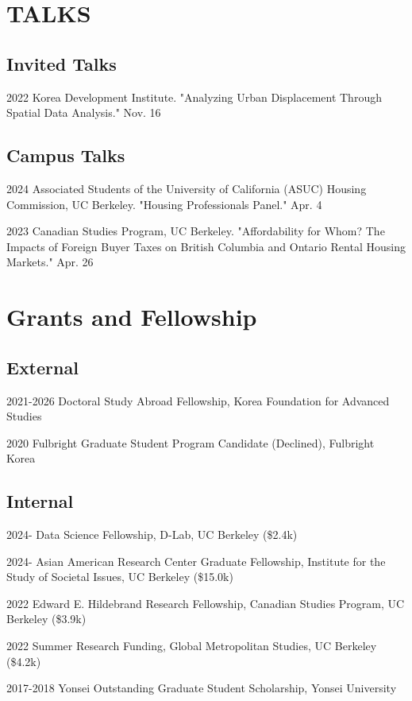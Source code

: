 \documentclass[12pt,letterpaper]{report}
\begin{document}
  \section*{TALKS}
    \subsection*{Invited Talks}
    \begin{tablist}
    \item[2022] \tab{}Korea Development Institute. "Analyzing Urban Displacement Through Spatial Data Analysis." Nov. 16
    \end{tablist}
    \subsection*{Campus Talks}
    \begin{tablist}
        \item[2024] \tab{}Associated Students of the University of California (ASUC) Housing Commission, UC Berkeley. "Housing Professionals Panel." Apr. 4
        \item[2023] \tab{}Canadian Studies Program, UC Berkeley. "Affordability for Whom? The Impacts of Foreign Buyer Taxes on British Columbia and Ontario Rental Housing Markets." Apr. 26
    \end{tablist}

\section*{Grants and Fellowship}
    \subsection*{External}
    \begin{tablist}
        \item[2021-2026] \tab{}Doctoral Study Abroad Fellowship, Korea Foundation for Advanced Studies
        \item[2020] \tab{}Fulbright Graduate Student Program Candidate (Declined), Fulbright Korea
    \end{tablist}
    \subsection*{Internal}
    \begin{tablist}
        \item[2024-] \tab{}Data Science Fellowship, D-Lab, UC Berkeley (\$2.4k)
        \item[2024-] \tab{}Asian American Research Center Graduate Fellowship, Institute for the Study of Societal Issues, UC Berkeley (\$15.0k)
        \item[2022] \tab{}Edward E. Hildebrand Research Fellowship, Canadian Studies Program, UC Berkeley (\$3.9k)
        \item[2022] \tab{}Summer Research Funding, Global Metropolitan Studies, UC Berkeley (\$4.2k)
        \item[2017-2018] \tab{}Yonsei Outstanding Graduate Student Scholarship, Yonsei University
    \end{tablist}
    
\end{document}
